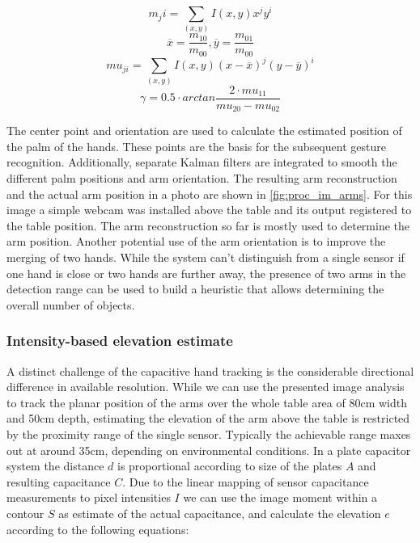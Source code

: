 \begin{equation}
m_ji=\sum_{(x,y)}{I(x,y)x^jy^i}
\end{equation}
\begin{equation}
\overline{x}=\frac{m_10}{m_00}, \overline{y}=\frac{m_01}{m_00}
\end{equation}
\begin{equation}
mu_{ji}=\sum_{(x,y)}{I(x,y)(x-\overline{x})^j(y-\overline{y})^i}
\end{equation}
\begin{equation}
\gamma=0.5\cdot arctan\frac{2\cdot{mu_{11}}}{mu_{20}-mu_{02}}
\end{equation}
 
The center point and orientation are used to calculate the estimated position of the palm of the hands. These points are the basis for the subsequent gesture recognition. Additionally, separate Kalman filters are integrated to smooth the different palm positions and arm orientation. The resulting arm reconstruction and the actual arm position in a photo are shown in \ref{fig:proc_im_arms}. For this image a simple webcam was installed above the table and its output registered to the table position. 
The arm reconstruction so far is mostly used to determine the arm position. Another potential use of the arm orientation is to improve the merging of two hands. While the system can't distinguish from a single sensor if one hand is close or two hands are further away, the presence of two arms in the detection range can be used to build a heuristic that allows determining the overall number of objects. 
\subsubsection{Intensity-based elevation estimate}
A distinct challenge of the capacitive hand tracking is the considerable directional difference in available resolution. While we can use the presented image analysis to track the planar position of the arms over the whole table area of 80cm width and 50cm depth, estimating the elevation of the arm above the table is restricted by the proximity range of the single sensor. Typically the achievable range maxes out at around 35cm, depending on environmental conditions. In a plate capacitor system the distance $d$ is proportional according to size of the plates $A$ and resulting capacitance $C$. Due to the linear mapping of sensor capacitance measurements to pixel intensities $I$ we can use the image moment within a contour $S$ as estimate of the actual capacitance, and calculate the elevation $e$ according to the following equations:

